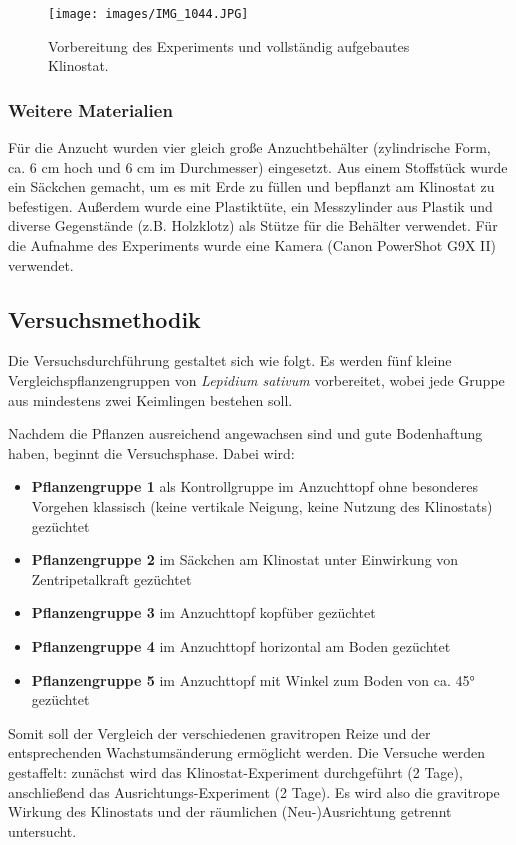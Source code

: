 \documentclass[
11pt, 
ngerman,
listof=totocnumbered,
oneside,
bibliography=totocnumbered,
abstracton
]{scrreprt}
\begin{document}
\begin{figure}[H]
	\centering 
	\texttt{[image: images/IMG\_1044.JPG]}
	\caption{Vorbereitung des Experiments und vollständig aufgebautes Klinostat.\label{Klinostat2}}
\end{figure}

\subsubsection{Weitere Materialien}

Für die Anzucht wurden vier gleich große Anzuchtbehälter (zylindrische Form, ca. 6 cm hoch und 6 cm im Durchmesser) eingesetzt. Aus einem Stoffstück wurde ein Säckchen gemacht, um es mit Erde zu füllen und bepflanzt am Klinostat zu befestigen. Außerdem wurde eine Plastiktüte, ein Messzylinder aus Plastik und diverse Gegenstände (z.B. Holzklotz) als Stütze für die Behälter verwendet. Für die Aufnahme des Experiments wurde eine Kamera (Canon PowerShot G9X II) verwendet.

\subsection{Versuchsmethodik}

Die Versuchsdurchführung gestaltet sich wie folgt. Es werden fünf kleine Vergleichspflanzengruppen von \emph{Lepidium sativum} vorbereitet, wobei jede Gruppe aus mindestens zwei Keimlingen bestehen soll. 

Nachdem die Pflanzen ausreichend angewachsen sind und gute Bodenhaftung haben, beginnt die Versuchsphase. Dabei wird: 

\begin{itemize}
	\item \textbf{Pflanzengruppe 1} als Kontrollgruppe im Anzuchttopf ohne besonderes Vorgehen klassisch (keine vertikale Neigung, keine Nutzung des Klinostats) gezüchtet
	\item \textbf{Pflanzengruppe 2} im Säckchen am Klinostat unter Einwirkung von Zentripetalkraft gezüchtet 
	\item \textbf{Pflanzengruppe 3} im Anzuchttopf kopfüber gezüchtet
	\item \textbf{Pflanzengruppe 4} im Anzuchttopf horizontal am Boden gezüchtet
	\item \textbf{Pflanzengruppe 5} im Anzuchttopf mit Winkel zum Boden von ca. \ang{45} gezüchtet 
\end{itemize}

Somit soll der Vergleich der verschiedenen gravitropen Reize und der entsprechenden Wachstumsänderung ermöglicht werden. Die Versuche werden gestaffelt: zunächst wird das Klinostat-Experiment durchgeführt (2 Tage), anschließend das Ausrichtungs-Experiment (2 Tage). Es wird also die gravitrope Wirkung des Klinostats und der räumlichen (Neu-)Ausrichtung getrennt untersucht. 
\end{document}

